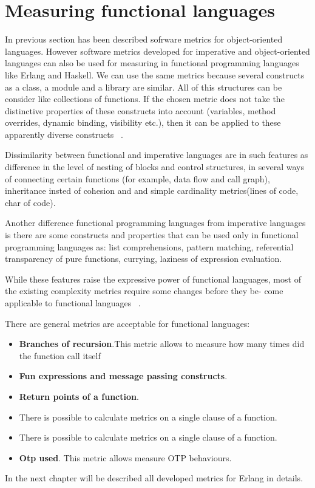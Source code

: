 \section{Measuring functional languages}
In previous section has been described sofrware metrics for object-oriented languages. However software metrics developed for imperative and object-oriented languages can also be used for measuring in functional programming languages like Erlang and Haskell. We can use the same metrics because several constructs as a class,  a module and a library are similar. All of this structures can be consider like collections of functions. If the chosen metric does not take the distinctive properties of these constructs into account (variables, method overrides, dynamic binding, visibility etc.), then it can be applied to these apparently diverse constructs ~\cite{metrics3}.

Dissimilarity between functional and imperative languages are in such features as difference in the level of nesting of blocks and control
structures, in several ways of connecting certain functions (for example, data flow and call graph), inheritance insted of cohesion and and simple cardinality metrics(lines of code, char of code).


Another difference functional programming languages from imperative languages is there are some constructs and properties that can be used only in functional programming languages as: list comprehensions, pattern matching, referential transparency of pure functions, currying, laziness of expression evaluation.

While these features raise the expressive power of functional languages,
most of the existing complexity metrics require some changes before they be-
come applicable to functional languages ~\cite{metrics3}.

There are general metrics are acceptable for functional languages:
\begin{itemize}
	\item \textbf{Branches of recursion}.This metric allows to measure how many times did the function call itself
	\item \textbf{Fun expressions and message passing constructs}.
	\item \textbf{Return points of a function}.
	\item There is possible to calculate metrics on a single clause of a function.
	\item There is possible to calculate metrics on a single clause of a function.
	\item \textbf{Otp used}. This metric allows measure OTP behaviours.
\end{itemize}

In the next chapter will be described all developed metrics for Erlang in details.



